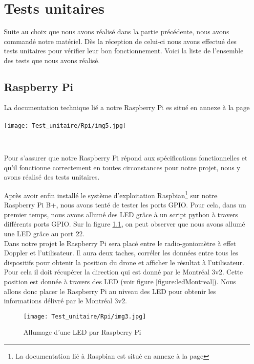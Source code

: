 \chapter{Tests unitaires}

Suite au choix que nous avons réalisé dans la partie précédente, nous avons commandé notre matériel. Dès la réception de celui-ci nous avons effectué des tests unitaires pour vérifier leur bon fonctionnement. Voici la liste de l'ensemble des tests que nous avons réalisé.

\section{Raspberry Pi}
La documentation technique lié a notre Raspberry Pi es situé en annexe à la page \pageref{annexe:rpi}
~\\

\texttt{[image: Test\_unitaire/Rpi/img5.jpg]}

~\\
\parindent=15pt

Pour s'assurer que notre Raspberry Pi répond aux spécifications fonctionnelles et qu'il fonctionne correctement en toutes circonstances pour notre projet, nous y avons réalisé des tests unitaires.

Après avoir enfin installé le système d'exploitation Raspbian\footnote{La documentation lié à Raspbian est situé en annexe à la page \pageref{annexe:raspbian}} sur notre Raspberry Pi B+, nous avons tenté de tester les ports GPIO. Pour cela, dans un premier temps, nous avons allumé des LED grâce à un script python à travers différents ports GPIO. Sur la figure \ref{figure:led}, on peut observer que nous avons allumé une LED grâce au port 22.
~\\

Dans notre projet le Raspberry Pi sera placé entre le radio-goniomètre à effet Doppler et l'utilisateur. Il aura deux taches, corréler les données entre tous les dispositifs pour obtenir la position du drone et afficher le résultat à l'utilisateur. Pour cela il doit récupérer la direction qui est donné par le Montréal 3v2. Cette position est donnée à travers des LED (voir figure \ref{figure:ledMontreal}). Nous allons donc placer le Raspberry Pi au niveau des LED pour obtenir les informations délivré par le Montréal 3v2. %

\begin{figure}[!h]
  \texttt{[image: Test\_unitaire/Rpi/img3.jpg]}
  \caption{Allumage d'une LED par Raspberry Pi}
  \label{figure:led}
\end{figure}

